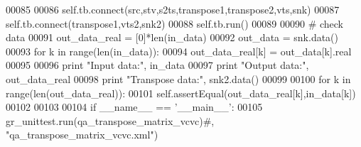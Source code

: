 \begin{DoxyCode}
00085         
00086         self.tb.connect(src,stv,s2ts,transpose1,transpose2,vts,snk)
00087         self.tb.connect(transpose1,vts2,snk2)
00088         self.tb.run()
00089         
00090         \textcolor{comment}{# check data}
00091         out\_data\_real = [0]*len(in\_data)
00092         out\_data = snk.data()
00093         \textcolor{keywordflow}{for} k \textcolor{keywordflow}{in} range(len(in\_data)):
00094             out\_data\_real[k] = out\_data[k].real
00095             
00096         \textcolor{keywordflow}{print} \textcolor{stringliteral}{"Input data:"}, in\_data
00097         \textcolor{keywordflow}{print} \textcolor{stringliteral}{"Output data:"}, out\_data\_real
00098         \textcolor{keywordflow}{print} \textcolor{stringliteral}{"Transpose data:"}, snk2.data()
00099             
00100         \textcolor{keywordflow}{for} k \textcolor{keywordflow}{in} range(len(out\_data\_real)):
00101             self.assertEqual(out\_data\_real[k],in\_data[k])
00102 
00103 
00104 \textcolor{keywordflow}{if} \_\_name\_\_ == \textcolor{stringliteral}{'\_\_main\_\_'}:
00105     gr\_unittest.run(qa\_transpose\_matrix\_vcvc)\textcolor{comment}{#, "qa\_transpose\_matrix\_vcvc.xml")}
\end{DoxyCode}
